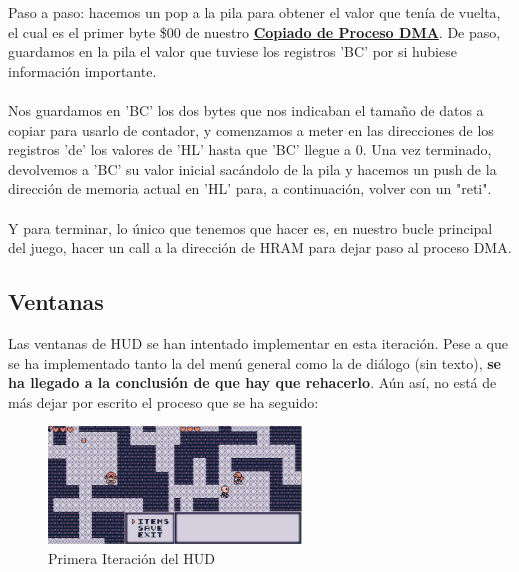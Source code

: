 Paso a paso: hacemos un pop a la pila para obtener el valor que tenía de vuelta, el cual es el primer byte \$00 de nuestro \hyperref[code:dma_copy1]{\textbf{Copiado de Proceso DMA}}. De paso, guardamos en la pila el valor que tuviese los registros 'BC' por si hubiese información importante.
\\ \\
Nos guardamos en 'BC' los dos bytes que nos indicaban el tamaño de datos a copiar para usarlo de contador, y comenzamos a meter en las direcciones de los registros 'de' los valores de 'HL' hasta que 'BC' llegue a 0. Una vez terminado, devolvemos a 'BC' su valor inicial sacándolo de la pila y hacemos un push de la dirección de memoria actual en 'HL' para, a continuación, volver con un "reti".
\\ \\
Y para terminar, lo único que tenemos que hacer es, en nuestro bucle principal del juego, hacer un call a la dirección de HRAM para dejar paso al proceso DMA.

\subsection{Ventanas}

Las ventanas de HUD se han intentado implementar en esta iteración. Pese a que se ha implementado tanto la del menú general como la de diálogo (sin texto), \textbf{se ha llegado a la conclusión de que hay que rehacerlo}. Aún así, no está de más dejar por escrito el proceso que se ha seguido:

\begin{figure}[h]
\centering
\includegraphics[width=0.6\textwidth]{include/images/desarrollo/hud1.png}
\caption{Primera Iteración del HUD}
\label{figure:hud1}
\end{figure}

